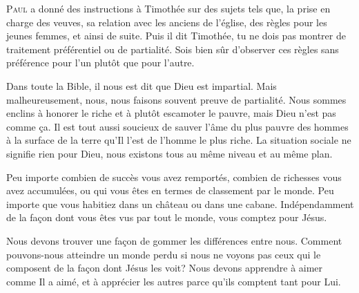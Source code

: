 
\lettrine{P}{aul} a donné des instructions à Timothée
 sur des sujets tels que, la prise en charge des veuves,
 sa relation avec les anciens de l'église, des règles pour les jeunes femmes,
 et ainsi de suite. Puis il dit\frcolon {}
 \Og Timothée, 
 tu ne dois pas montrer de traitement préférentiel ou de partialité.
 Sois bien sûr d'observer ces règles sans préférence pour l'un plutôt
 que pour l'autre. \Fg{}

Dans toute la Bible, il nous est dit que Dieu est impartial.
 Mais malheureusement, nous, nous faisons souvent preuve de partialité.
 Nous sommes enclins à honorer le riche et à plutôt escamoter le pauvre,
 mais Dieu n'est pas comme \c{c}a. Il est tout aussi soucieux de sauver l'âme
 du plus pauvre des hommes à la surface de la terre qu'Il l'est de l'homme
 le plus riche. La situation sociale ne signifie rien pour Dieu,
 nous existons tous au même niveau et au même plan. 


Peu importe combien de succès vous avez remportés, combien de richesses
 vous avez accumulées, ou qui vous êtes en termes de classement par le monde.
 Peu importe que vous habitiez dans un château ou dans une cabane.
 Indépendamment de la fa\c{c}on dont vous êtes vus par tout le monde,
 vous comptez pour Jésus. 

Nous devons trouver une fa\c{c}on de gommer les différences entre nous.
 Comment pouvons-nous atteindre un monde perdu si nous ne voyons pas
 ceux qui le composent de la fa\c{c}on dont Jésus les voit?
 Nous devons apprendre à aimer comme Il a aimé, et à apprécier les autres
 parce qu'ils comptent tant pour Lui.

\dvrule







